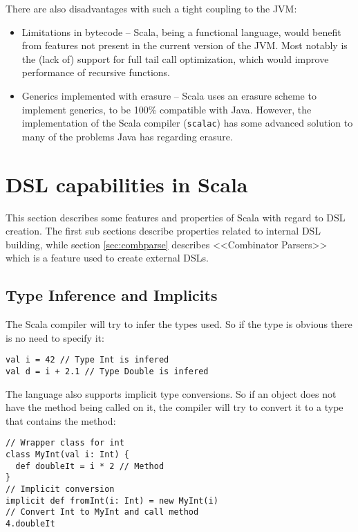 \documentclass[a4paper,english]{report}
\begin{document}
There are also disadvantages with such a tight coupling to the JVM:

\begin{itemize}
\item Limitations in bytecode -- Scala, being a functional language,
  would benefit from features not present in the current version of
  the JVM. Most notably is the (lack of) support for full tail call
  optimization, which would improve performance of recursive
  functions.
\item Generics implemented with erasure -- Scala uses an erasure
  scheme to implement generics, to be 100\% compatible with
  Java. However, the implementation of the Scala compiler
  (\texttt{scalac}) has some advanced solution to many of the problems
  Java has regarding erasure\cite{emi06}.
\end{itemize}

\section{DSL capabilities in Scala}

This section describes some features and properties of Scala with
regard to DSL creation. The first sub sections describe properties
related to internal DSL building, while section \vref{sec:combparse}
describes <<Combinator Parsers>> which is a feature used to create
external DSLs.

\subsection{Type Inference and Implicits}

The Scala compiler will try to infer the types used. So if the type is
obvious there is no need to specify it:

\begin{lstlisting}
val i = 42 // Type Int is infered
val d = i + 2.1 // Type Double is infered
\end{lstlisting}

The language also supports implicit type conversions. So if an object
does not have the method being called on it, the compiler will try to
convert it to a type that contains the method:

\begin{lstlisting}
// Wrapper class for int
class MyInt(val i: Int) {
  def doubleIt = i * 2 // Method
}
// Implicit conversion
implicit def fromInt(i: Int) = new MyInt(i)
// Convert Int to MyInt and call method
4.doubleIt
\end{lstlisting}
\end{document}
